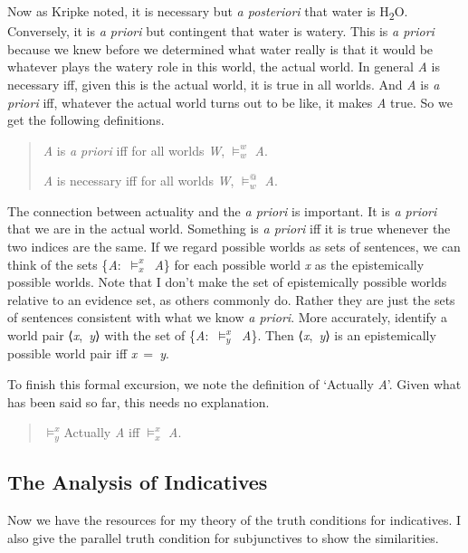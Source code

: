 \documentclass[
  10pt,
  letterpaper,
  DIV=11,
  numbers=noendperiod,
  twoside]{scrartcl}
\begin{document}
Now as Kripke noted, it is necessary but \emph{a posteriori} that water
is H\textsubscript{2}O. Conversely, it is \emph{a priori} but contingent
that water is watery. This is \emph{a priori} because we knew before we
determined what water really is that it would be whatever plays the
watery role in this world, the actual world. In general \emph{A} is
necessary iff, given this is the actual world, it is true in all worlds.
And \emph{A} is \emph{a priori} iff, whatever the actual world turns out
to be like, it makes \emph{A} true. So we get the following definitions.

\begin{quote}
\emph{A} is \emph{a priori} iff for all worlds \emph{W}, \(\vDash_w^w\)
\emph{A}.

\emph{A} is necessary iff for all worlds \emph{W}, \(\vDash_w^@\)
\emph{A}.
\end{quote}

The connection between actuality and the \emph{a priori} is important.
It is \emph{a priori} that we are in the actual world. Something is
\emph{a priori} iff it is true whenever the two indices are the same. If
we regard possible worlds as sets of sentences, we can think of the sets
\{\emph{A}:~\(\vDash_x^x\)~\emph{A}\} for each possible world \emph{x}
as the epistemically possible worlds. Note that I don't make the set of
epistemically possible worlds relative to an evidence set, as others
commonly do. Rather they are just the sets of sentences consistent with
what we know \emph{a priori}. More accurately, identify a world pair
⟨\emph{x},~\emph{y}⟩ with the set of
\{\emph{A}:~\(\vDash_y^x\)~\emph{A}\}. Then ⟨\emph{x},~\emph{y}⟩ is an
epistemically possible world pair iff \emph{x}~=~\emph{y}.

To finish this formal excursion, we note the definition of `Actually
\emph{A}'. Given what has been said so far, this needs no explanation.

\begin{quote}
\(\vDash_y^x\)Actually \emph{A} iff \(\vDash_x^x\) \emph{A}.
\end{quote}

\subsection{The Analysis of
Indicatives}\label{the-analysis-of-indicatives}

Now we have the resources for my theory of the truth conditions for
indicatives. I also give the parallel truth condition for subjunctives
to show the similarities.
\end{document}
